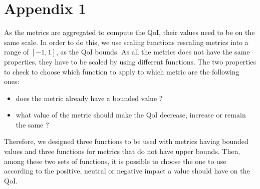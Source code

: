 \chapter{Appendix 1}
\label{annex:functions}
As the metrics are aggregated to compute the QoI, their values need to be on the same scale. In order to do this, we use scaling functions rescaling metrics into a range of $[-1,1]$, as the QoI bounds. As all the metrics does not have the same properties, they have to be scaled by using different functions. The two properties to check to choose which function to apply to which metric are the following ones:
\begin{itemize}
	\item does the metric already have a bounded value ?
	\item what value of the metric should make the QoI decrease, increase or remain the same ?
\end{itemize}
Therefore, we designed three functions to be used with metrics having bounded values and three functions for metrics that do not have upper bounds. Then, among these two sets of functions, it is possible to choose the one to use according to the positive, neutral or negative impact a value should have on the QoI.

